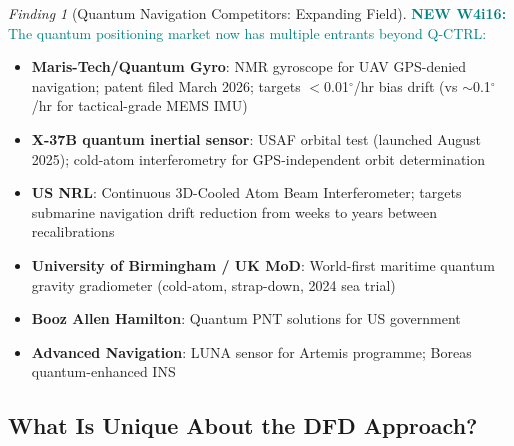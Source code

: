 \documentclass[11pt]{article}
\theoremstyle{definition}
\theoremstyle{remark}
\newtheorem{finding}[theorem]{Finding}
\newcommand{\newfinding}[1]{\textcolor{teal}{\textbf{NEW W4i16:} #1}}
\begin{document}
\begin{finding}[Quantum Navigation Competitors: Expanding Field]
\label{find:competitors}
\newfinding{The quantum positioning market now has multiple entrants
beyond Q-CTRL:}
\begin{itemize}[nosep]
  \item \textbf{Maris-Tech/Quantum Gyro}: NMR gyroscope for UAV
    GPS-denied navigation; patent filed March 2026; targets
    $<$0.01$^\circ$/hr bias drift (vs $\sim$0.1$^\circ$/hr for
    tactical-grade MEMS IMU)
  \item \textbf{X-37B quantum inertial sensor}: USAF orbital test
    (launched August 2025); cold-atom interferometry for
    GPS-independent orbit determination
  \item \textbf{US NRL}: Continuous 3D-Cooled Atom Beam Interferometer;
    targets submarine navigation drift reduction from weeks
    to years between recalibrations
  \item \textbf{University of Birmingham / UK MoD}: World-first
    maritime quantum gravity gradiometer (cold-atom, strap-down,
    2024 sea trial)
  \item \textbf{Booz Allen Hamilton}: Quantum PNT solutions for
    US government
  \item \textbf{Advanced Navigation}: LUNA sensor for Artemis
    programme; Boreas quantum-enhanced INS
\end{itemize}
\end{finding}

\subsection{What Is Unique About the DFD Approach?}
\end{document}
